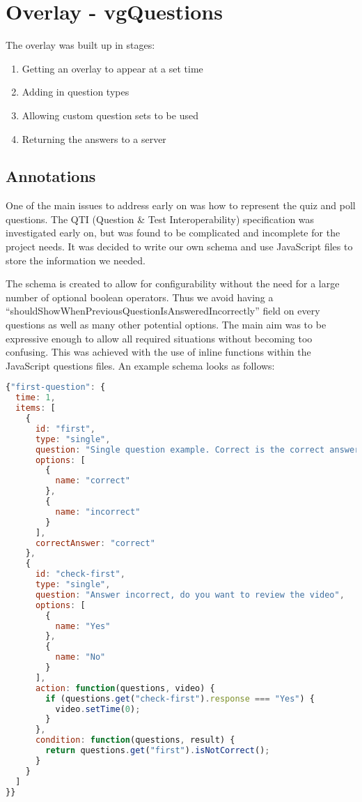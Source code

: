 \chapter{Overlay - vgQuestions} \label{Chapter:Overlay}

The overlay was built up in stages:
\begin{enumerate}
\item Getting an overlay to appear at a set time
\item Adding in question types
\item Allowing custom question sets to be used
\item Returning the answers to a server
\end{enumerate}

\section{Annotations}
\label{Section:Question sets}

One of the main issues to address early on was how to represent the quiz and
poll questions. The QTI (Question \& Test Interoperability) specification was
investigated early on, but was found to be complicated and incomplete for the
project needs. It was decided to write our own schema and use JavaScript files
to store the information we needed.

The schema is created to allow for configurability without the need for a large
number of optional boolean operators. Thus we avoid having a
``shouldShowWhenPreviousQuestionIsAnsweredIncorrectly'' field on every
questions as well as many other potential options. The main aim was to be
expressive enough to allow all required situations without becoming too
confusing. This was achieved with the use of inline functions within the
JavaScript questions files. An example schema looks as follows:

\begin{lstlisting}[language=javascript]
{"first-question": {
  time: 1,
  items: [
    {
      id: "first",
      type: "single",
      question: "Single question example. Correct is the correct answer",
      options: [
        {
          name: "correct"
        },
        {
          name: "incorrect"
        }
      ],
      correctAnswer: "correct"
    },
    {
      id: "check-first",
      type: "single",
      question: "Answer incorrect, do you want to review the video",
      options: [
        {
          name: "Yes"
        },
        {
          name: "No"
        }
      ],
      action: function(questions, video) {
        if (questions.get("check-first").response === "Yes") {
          video.setTime(0);
        }
      },
      condition: function(questions, result) {
        return questions.get("first").isNotCorrect();
      }
    }
  ]
}}
\end{lstlisting}

